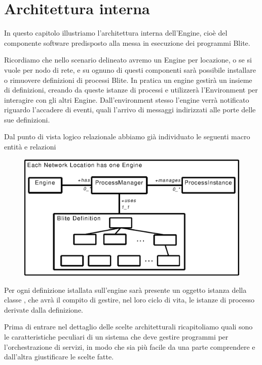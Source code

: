 \chapter{Architettura interna}

In questo capitolo illustriamo l'architettura interna dell'Engine, cioè del
componente software predisposto alla messa in esecuzione dei programmi Blite.

Ricordiamo che nello scenario delineato avremo un Engine per locazione, o se si
vuole per nodo di rete, e su ognuno di questi componenti sarà possibile
installare o rimuovere definizioni di processi Blite. In pratica un engine
gestir\`a un insieme di definizioni, creando da queste istanze di
processi e utilizzerà l'Environment per interagire con gli altri Engine. 
Dall'environment stesso l'engine verrà notificato riguardo l'accadere di
eventi, quali l'arrivo di messaggi indirizzati alle porte delle sue definizioni.

Dal punto di vista logico relazionale abbiamo già individuato le seguenti
macro entità e relazioni

\begin{figure}[!htp]
\begin{center}
  \includegraphics{architettura_interna/dia/engine}
  \label{fig:1}
\end{center}
\end{figure}

Per ogni definizione istallata sull'engine sarà presente un oggetto istanza
della classe , che avrà il compito di gestire, nel loro
ciclo di vita, le istanze di processo derivate dalla definizione.

Prima di entrare nel dettaglio delle scelte architetturali ricapitoliamo quali
sono le caratteristiche peculiari di un sistema che deve gestire programmi per
l'orchestrazione di servizi, in modo che sia pi\`u facile da una parte
comprendere e dall'altra giustificare le scelte fatte.

